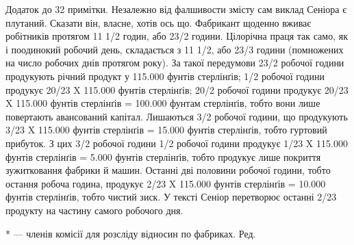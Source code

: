 Додаток до 32 примітки. Незалежно від фалшивости змісту сам виклад Сеніора є плутаний. Сказати він,
власне, хотів ось що. Фабрикант щоденно вживає робітників протягом 11 1/2 годин, або 23/2 години.
Цілорічна праця так само, як і поодинокий робочий день, складається з 11 1/2,
або 23/3 години (помножених на число робочих днів протягом року). За такої передумови 23/2 робочої
години продукують річний продукт у 115.000 фунтів стерлінґів; 1/2 робочої години продукує 20/23 X
115.000 фунтів стерлінґів; 20/2 робочої години продукує 20/23 X 115.000 фунтів стерлінґів = 100.000
фунтам стерлінґів, тобто вони лише повертають
авансований капітал. Лишаються 3/2 робочої години, що продукують 3/23 X 115.000 фунтів стерлінґів =
15.000 фунтів стерлінґів, тобто гуртовий прибуток. З цих 3/2 робочої години 1/2 робочої години
продукує 1/23 X 115.000 фунтів стерлінґів = 5.000 фунтів стерлінґів, тобто продукує
лише покриття зужитковання фабрики й машин. Останні дві половини робочої години, тобто остання
робоча година, продукує 2/23 X 115.000 фунтів стерлінґів = 10.000 фунтів стерлінґів, тобто чистий
зиск.
У тексті Сеніор перетворює останні 2/23 продукту на частину самого робочого
дня.

* — членів комісії для розсліду відносин по фабриках. Ред.
